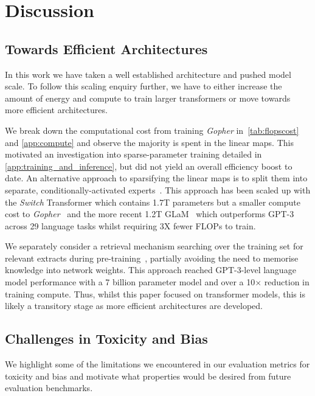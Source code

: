 \documentclass[11pt, a4paper, logo, internal, copyright, nonumbering]{deepmind}
\newcommand{\gopher}{\textit{Gopher}\xspace}
\begin{document}
\section{Discussion} 
\label{sec:discussion}

\subsection{Towards Efficient Architectures}
In this work we have taken a well established architecture and pushed model scale. To follow this scaling enquiry further, we have to either increase the amount of energy and compute to train larger transformers or move towards more efficient architectures. 

We break down the computational cost from training \gopher in~\autoref{tab:flopscost} and \autoref{app:compute} and observe the majority is spent in the linear maps. This motivated an investigation into sparse-parameter training detailed in \autoref{app:training_and_inference}, but did not yield an overall efficiency boost to date. An alternative approach to sparsifying the linear maps is to split them into separate, conditionally-activated experts~\citep{lepikhin2020gshard, fedus2021switch, lin2021m610t}. This approach has been scaled up with the \textit{Switch} Transformer which contains 1.7T parameters but a smaller compute cost to \gopher~\citep{fedus2021switch} and  the more recent 1.2T GLaM~\citep{du2021glam} which outperforms GPT-3 across 29 language tasks whilst requiring 3X fewer FLOPs to train. 

We separately consider a retrieval mechanism searching over the training set for relevant extracts during pre-training~\citep{borgeaud2021retrieval}, partially avoiding the need to memorise knowledge into network weights. This approach reached GPT-3-level language model performance with a 7 billion parameter model and over a 10$\times$ reduction in training compute. Thus, whilst this paper focused on transformer models, this is likely a transitory stage as more efficient architectures are developed.



\subsection{Challenges in Toxicity and Bias}
\label{tox-bias-limitations}

We highlight some of the limitations we encountered in our evaluation metrics for toxicity and bias and motivate what properties would be desired from future evaluation benchmarks.
\end{document}
